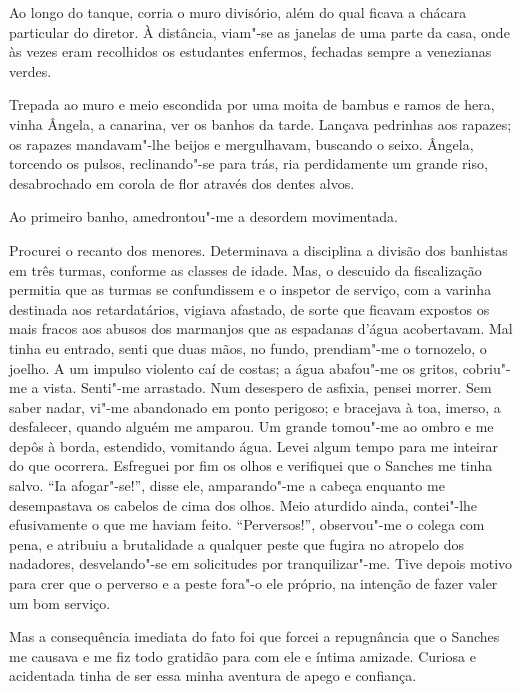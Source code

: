 Ao longo do tanque, corria o muro divisório, além do
qual ficava a chácara particular do diretor. À distância, viam"-se as
janelas de uma parte da casa, onde às vezes eram recolhidos os
estudantes enfermos, fechadas sempre a venezianas verdes. 

Trepada ao muro e meio escondida por uma moita de bambus e ramos de hera, 
vinha Ângela, a canarina, ver os banhos da tarde. Lançava pedrinhas aos
rapazes; os rapazes mandavam"-lhe beijos e mergulhavam, buscando o
seixo. Ângela, torcendo os pulsos, reclinando"-se para trás, ria
perdidamente um grande riso, desabrochado em corola de flor através dos
dentes alvos. 

Ao primeiro banho, amedrontou"-me a desordem movimentada. 

Procurei o recanto dos menores. Determinava a disciplina a
divisão dos banhistas em três turmas, conforme as classes de idade.
Mas, o descuido da fiscalização permitia que as turmas se confundissem
e o inspetor de serviço, com a varinha destinada aos retardatários,
vigiava afastado, de sorte que ficavam expostos os mais fracos aos
abusos dos marmanjos que as espadanas d'água acobertavam. Mal tinha eu
entrado, senti que duas mãos, no fundo, prendiam"-me o tornozelo, o
joelho. A um impulso violento caí de costas; a água abafou"-me os
gritos, cobriu"-me a vista. Senti"-me arrastado. Num desespero de
asfixia, pensei morrer. Sem saber nadar, vi"-me abandonado em ponto
perigoso; e bracejava à toa, imerso, a desfalecer, quando alguém me
amparou. Um grande tomou"-me ao ombro e me depôs à borda, estendido,
vomitando água. Levei algum tempo para me inteirar do que ocorrera.
Esfreguei por fim os olhos e verifiquei que o Sanches me tinha salvo.
``Ia afogar"-se!'', disse ele, amparando"-me a cabeça enquanto me
desempastava os cabelos de cima dos olhos. Meio aturdido ainda,
contei"-lhe efusivamente o que me haviam feito. ``Perversos!'', 
observou"-me o colega com pena, e atribuiu a brutalidade a qualquer
peste que fugira no atropelo dos nadadores, desvelando"-se em
solicitudes por tranquilizar"-me. Tive depois motivo para crer que o
perverso e a peste fora"-o ele próprio, na intenção de fazer valer um
bom serviço. 

Mas a consequência imediata do fato foi que forcei a
repugnância que o Sanches me causava e me fiz todo gratidão para com
ele e íntima amizade. Curiosa e acidentada tinha de ser essa minha
aventura de apego e confiança. 

